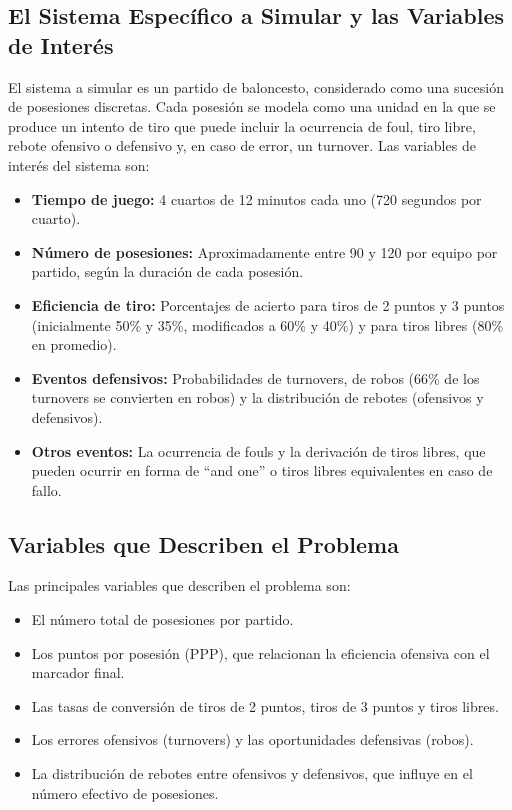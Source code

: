 \documentclass[12pt]{article}
\begin{document}
\subsection{El Sistema Específico a Simular y las Variables de Interés}
El sistema a simular es un partido de baloncesto, considerado como una sucesión de posesiones discretas. Cada posesión se modela como una unidad en la que se produce un intento de tiro que puede incluir la ocurrencia de foul, tiro libre, rebote ofensivo o defensivo y, en caso de error, un turnover. Las variables de interés del sistema son:
\begin{itemize}
	\item \textbf{Tiempo de juego:} 4 cuartos de 12 minutos cada uno (720 segundos por cuarto).
	\item \textbf{Número de posesiones:} Aproximadamente entre 90 y 120 por equipo por partido, según la duración de cada posesión.
	\item \textbf{Eficiencia de tiro:} Porcentajes de acierto para tiros de 2 puntos y 3 puntos (inicialmente 50\% y 35\%, modificados a 60\% y 40\%) y para tiros libres (80\% en promedio).
	\item \textbf{Eventos defensivos:} Probabilidades de turnovers, de robos (66\% de los turnovers se convierten en robos) y la distribución de rebotes (ofensivos y defensivos).
	\item \textbf{Otros eventos:} La ocurrencia de fouls y la derivación de tiros libres, que pueden ocurrir en forma de “and one” o tiros libres equivalentes en caso de fallo.
\end{itemize}

\subsection{Variables que Describen el Problema}
Las principales variables que describen el problema son:
\begin{itemize}
	\item El número total de posesiones por partido.
	\item Los puntos por posesión (PPP), que relacionan la eficiencia ofensiva con el marcador final.
	\item Las tasas de conversión de tiros de 2 puntos, tiros de 3 puntos y tiros libres.
	\item Los errores ofensivos (turnovers) y las oportunidades defensivas (robos).
	\item La distribución de rebotes entre ofensivos y defensivos, que influye en el número efectivo de posesiones.
\end{itemize}
\end{document}
